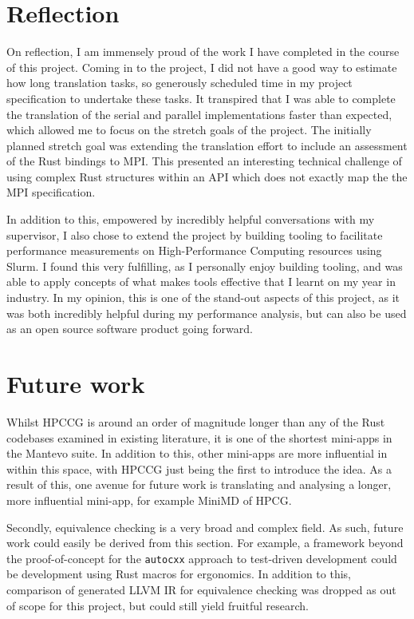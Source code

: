 \section{Reflection}
\label{sec:reflection} %

On reflection, I am immensely proud of the work I have completed in the course of this project. Coming in to the project, I did not have a good way to estimate how long translation tasks, so generously scheduled time in my project specification to undertake these tasks. It transpired that I was able to complete the translation of the serial and parallel implementations faster than expected, which allowed me to focus on the stretch goals of the project. The initially planned stretch goal was extending the translation effort to include an assessment of the Rust bindings to MPI. This presented an interesting technical challenge of using complex Rust structures within an API which does not exactly map the the MPI specification.

In addition to this, empowered by incredibly helpful conversations with my supervisor, I also chose to extend the project by building tooling to facilitate performance measurements on High-Performance Computing resources using Slurm. I found this very fulfilling, as I personally enjoy building tooling, and was able to apply concepts of what makes tools effective that I learnt on my year in industry. In my opinion, this is one of the stand-out aspects of this project, as it was both incredibly helpful during my performance analysis, but can also be used as an open source software product going forward.


\section{Future work}
\label{sec:future-work} %

Whilst HPCCG is around an order of magnitude longer than any of the Rust codebases examined in existing literature, it is one of the shortest mini-apps in the Mantevo suite. In addition to this, other mini-apps are more influential in within this space, with HPCCG just being the first to introduce the idea. As a result of this, one avenue for future work is translating and analysing a longer, more influential mini-app, for example MiniMD of HPCG.

Secondly, equivalence checking is a very broad and complex field. As such, future work could easily be derived from this section. For example, a framework beyond the proof-of-concept for the \texttt{autocxx} approach to test-driven development could be development using Rust macros for ergonomics. In addition to this, comparison of generated LLVM IR for equivalence checking was dropped as out of scope for this project, but could still yield fruitful research.

